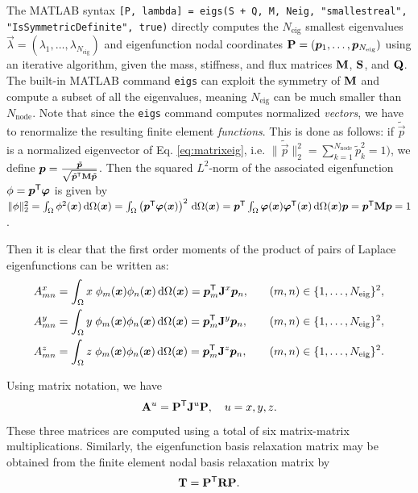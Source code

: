 \documentclass[a4paper]{article}
\begin{document}
The MATLAB syntax \verb|[P, lambda] = eigs(S + Q, M, Neig, "smallestreal", "IsSymmetricDefinite", true)| directly computes the $N_\text{eig}$ smallest eigenvalues $\vec{\lambda} = (\lambda_1, \dots, \lambda_{N_\text{eig}})$ and eigenfunction nodal coordinates $\mathbf{P} = (\bm{p}_1, \dots, \bm{p}_{N_\text{eig}})$ using an iterative algorithm, given the mass, stiffness, and flux matrices $\mathbf{M}$, $\mathbf{S}$, and $\mathbf{Q}$. The built-in MATLAB command \verb+eigs+\cite{stewart2002,lehoucq1998} can exploit the symmetry of $\mathbf{M}$ and compute a subset of all the eigenvalues, meaning $N_\text{eig}$ can be much smaller than $N_\text{node}$. Note that since the \verb+eigs+ command computes normalized \emph{vectors}, we have to renormalize the resulting finite element \emph{functions}. This is done as follows: if $\tilde{\vec{p}}$ is a normalized eigenvector of Eq. \eqref{eq:matrixeig}, i.e. $\| \tilde{\vec{p}} \|_2^2 = \sum_{k = 1}^{N_\text{node}} \tilde{p}_k^2 = 1)$, we define $\bm{p} = \frac{\tilde{\bm{p}}}{\sqrt{\tilde{\bm{p}}^{\mathsf{T}} \mathbf{M} \tilde{\bm{p}}}}$. Then the squared $L^2$-norm of the associated eigenfunction $\phi = \bm{p}^{\mathsf{T}} \bm{\varphi}$ is given by $\|\phi\|_2^2 = \int_\Omega \phi^2(\bm{x}) \, \mathrm{d} \Omega(\bm{x}) = \int_\Omega \left(\bm{p}^{\mathsf{T}} \bm{\varphi}(\bm{x})\right)^2 \, \mathrm{d} \Omega(\bm{x}) = \bm{p}^{\mathsf{T}} \int_\Omega \bm{\varphi}(\bm{x}) \bm{\varphi}^{\mathsf{T}}(\bm{x}) \, \mathrm{d} \Omega(\bm{x}) \bm{p} = \bm{p}^{\mathsf{T}} \mathbf{M} \bm{p} = 1$.

Then it is clear that the first order moments of the product of pairs of Laplace eigenfunctions can be written as:
\begin{alignat}{3}
    A_{mn}^x & = \int_\Omega x \; \phi_m(\bm{x}) \phi_n(\bm{x}) \, \mathrm{d} \Omega(\bm{x}) = \bm{p}_m^{\mathsf{T}} \mathbf{J}^x \bm{p}_n, \quad &  & (m, n) \in \{1, \dots, N_\text{eig}\}^2, \\
    A_{mn}^y & = \int_\Omega y \; \phi_m(\bm{x}) \phi_n(\bm{x}) \, \mathrm{d} \Omega(\bm{x}) = \bm{p}_m^{\mathsf{T}} \mathbf{J}^y \bm{p}_n, \quad &  & (m, n) \in \{1, \dots, N_\text{eig}\}^2, \\
    A_{mn}^z & = \int_\Omega z \; \phi_m(\bm{x}) \phi_n(\bm{x}) \, \mathrm{d} \Omega(\bm{x}) = \bm{p}_m^{\mathsf{T}} \mathbf{J}^z \bm{p}_n, \quad &  & (m, n) \in \{1, \dots, N_\text{eig}\}^2.
\end{alignat}

Using matrix notation, we have
\begin{equation}
    \mathbf{A}^u = \mathbf{P}^{\mathsf{T}}\mathbf{J}^u\mathbf{P}, \quad u = x, y, z.
\end{equation}
These three matrices are computed using a total of six matrix-matrix multiplications. Similarly, the eigenfunction basis relaxation matrix  may be obtained from the finite element nodal basis relaxation matrix  by
\begin{equation}
    \mathbf{T} = \mathbf{P}^{\mathsf{T}} \mathbf{R} \mathbf{P}.
\end{equation}
\end{document}
